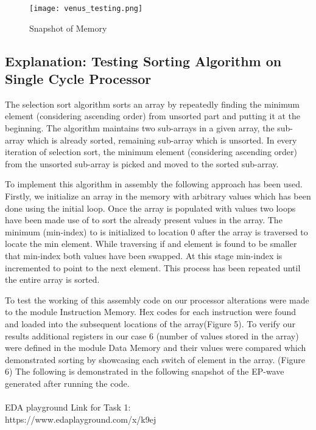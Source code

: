 \documentclass{article}
\begin{document}
\begin{center}
    \begin{figure}[!htb]
        \centering
        \texttt{[image: venus\_testing.png]}
        \caption{Snapshot of Memory}
        \label{Snapshot of Memory}
    \end{figure}
\end{center}

\subsection{Explanation: Testing Sorting Algorithm on Single Cycle Processor}
The selection sort algorithm sorts an array by repeatedly finding the minimum element (considering ascending order) from unsorted part and putting it at the beginning. The algorithm maintains two sub-arrays in a given array, the sub-array which is already sorted, remaining sub-array which is unsorted. In every iteration of selection sort, the minimum element (considering ascending order) from the unsorted sub-array is picked and moved to the sorted sub-array.

To implement this algorithm in assembly the following approach has been used. Firstly, we initialize an array in the memory with arbitrary values which has been done using the initial loop. Once the array is populated with values two loops have been made use of to sort the already present values in the array. The minimum (min-index) to is initialized to location 0 after the array is traversed to locate the min element. While traversing if and element is found to be smaller that min-index both values have been swapped. At this stage min-index is incremented to point to the next element. This process has been repeated until the entire array is sorted. 

To test the working of this assembly code on our processor alterations were made to the module Instruction Memory. Hex codes for each instruction were found and loaded into the subsequent locations of the array(Figure 5). To verify our results additional registers in our case 6 (number of values stored in the array) were defined in the module Data Memory and their values were compared which demonstrated sorting by showcasing each switch of element in the array. (Figure 6) The following is demonstrated in the following snapshot of the EP-wave generated after running the code. \\\\ EDA playground Link for Task 1:\\https://www.edaplayground.com/x/k9ej
\end{document}
